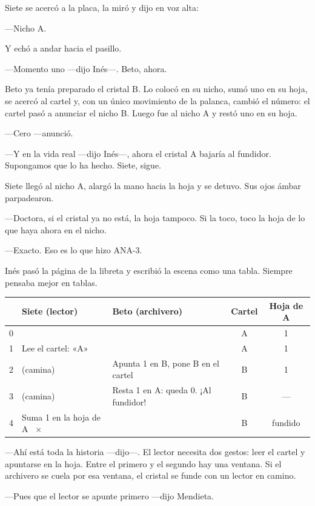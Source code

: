 Siete se acercó a la placa, la miró y dijo en voz alta:

---Nicho A.

Y echó a andar hacia el pasillo.

---Momento uno ---dijo Inés---\nobreak. Beto, ahora.

Beto ya tenía preparado el cristal B. Lo colocó en su nicho, sumó uno en su hoja, se acercó al cartel y, con un único movimiento de la palanca, cambió el número: el cartel pasó a anunciar el nicho B. Luego fue al nicho A y restó uno en su hoja.

---Cero ---anunció.

---Y en la vida real ---dijo Inés---\nobreak, ahora el cristal A bajaría al fundidor. Supongamos que lo ha hecho. Siete, sigue.

Siete llegó al nicho A, alargó la mano hacia la hoja y se detuvo. Sus ojos ámbar parpadearon.

---Doctora, si el cristal ya no está, la hoja tampoco. Si la toco, toco la hoja de lo que haya ahora en el nicho.

---Exacto. Eso es lo que hizo ANA-3.

Inés pasó la página de la libreta y escribió la escena como una tabla. Siempre pensaba mejor en tablas.

\begin{pizarra}
\begin{tabular}{@{}c p{2.6cm} p{2.6cm} c c@{}}
\toprule
& \textbf{Siete (lector)} & \textbf{Beto (archivero)} & \textbf{Cartel} & \textbf{Hoja de A} \\
\midrule
0 & & & A & 1 \\
1 & Lee el cartel: «A» & & A & 1 \\
2 & (camina) & Apunta 1 en B, pone B en el cartel & B & 1 \\
3 & (camina) & Resta 1 en A: queda 0. ¡Al fundidor! & B & --- \\
4 & Suma 1 en la hoja de A \ \textcolor{oxido}{$\boldsymbol\times$} & & B & fundido \\
\bottomrule
\end{tabular}
\end{pizarra}

---Ahí está toda la historia ---dijo---\nobreak. El lector necesita dos gestos: leer el cartel y apuntarse en la hoja. Entre el primero y el segundo hay una ventana. Si el archivero se cuela por esa ventana, el cristal se funde con un lector en camino.

---Pues que el lector se apunte primero ---dijo Mendieta.

